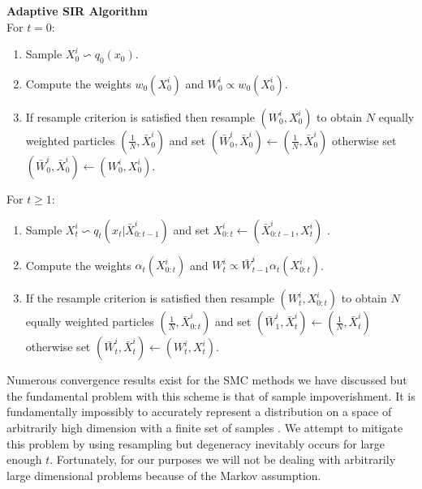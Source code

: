 \textbf{Adaptive SIR Algorithm}\\
For $t=0$:
\begin{enumerate}
\item
Sample $X^i_0 \backsim q_0(x_0)$.
\item
Compute the weights $w_0(X_0^i)$ and $W^i_0 \propto w_0(X^i_0)$.
\item
If resample criterion is satisfied then resample $(W^i_0, X^i_0)$ to obtain $N$ equally weighted particles $(\frac{1}{N}, \bar{X}^i_0)$ and set $(\bar{W}^i_0, \bar{X}^i_0) \leftarrow (\frac{1}{N}, \bar{X}^i_0)$ otherwise set $(\bar{W}^i_0, \bar{X}^i_0) \leftarrow ({W}^i_0, {X}^i_0)$.
\end{enumerate}
For $t \geq 1$:
\begin{enumerate}
\item
Sample $X^i_t \backsim q_t(x_t|\bar{X}^i_{0:t-1})$ and set ${X}^i_{0:t} \leftarrow (\bar{X}^i_{0:t-1}, X^i_t)$ .
\item
Compute the weights $\alpha_t(X^i_{0:t})$ and $W^i_t \propto \bar{W}^i_{t-1}\alpha_t(X^i_{0:t})$.
\item
If the resample criterion is satisfied then resample $(W^i_t, X^i_{0:t})$ to obtain $N$ equally weighted particles $(\frac{1}{N}, \bar{X}^i_{0:t})$ and set $(\bar{W}^i_1, \bar{X}^i_t) \leftarrow (\frac{1}{N}, \bar{X}^i_t)$ otherwise set $(\bar{W}^i_t, \bar{X}^i_t) \leftarrow ({W}^i_t, {X}^i_t)$.
\end{enumerate}

Numerous convergence results exist for the SMC methods we have discussed but the fundamental problem with this scheme is that of sample impoverishment. It is fundamentally impossibly to accurately represent a distribution on a space of arbitrarily high dimension with a finite set of samples \cite{pftut}. We attempt to mitigate this problem by using resampling but degeneracy inevitably occurs for large enough $t$. Fortunately, for our purposes we will not be dealing with arbitrarily large dimensional problems because of the Markov assumption.

